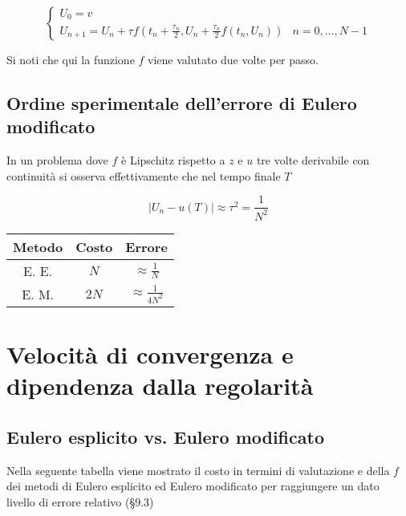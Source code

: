 \documentclass[hidelinks, 10pt]{report}
\begin{document}
\[
\begin{cases}
U_{0} = v \\
U_{n + 1} = U_{n} + \tau f \left( t_{n} + \frac{\tau_{n}}{2}, U_{n} + \frac{\tau_{n}}{2} f(t_{n}, U_{n}) \right)	 & n = 0, \dotsc, N - 1
\end{cases}
\]

Si noti che qui la funzione $ f $ viene valutato due volte per passo. 

\subsection{Ordine sperimentale dell'errore di Eulero modificato}
In un problema dove $ f $ \`e Lipschitz rispetto a  $ z $ e $ u $ tre volte derivabile con continuit\`a si osserva effettivamente che nel tempo finale $ T $

\[ \vert U_{n} - u(T) \vert \approx \tau^{2} = \frac{1}{N^{2}} \]

\begin{center}
\begin{tabular}{c|c|c}
	Metodo & Costo & Errore \\
\hline
	E. E. & $ N $ & $ \approx \frac{1}{N} $ \\
\hline
	E. M. & $ 2N $ & $ \approx \frac{1}{4N^{2}} $ \\
\end{tabular}
\end{center}

\section{Velocit\`a di convergenza e dipendenza dalla regolarit\`a}
\subsection{Eulero esplicito vs. Eulero modificato}

Nella seguente tabella viene mostrato il costo in termini di valutazione e della $ f $ dei metodi di Eulero esplicito ed Eulero modificato per raggiungere un dato livello di errore relativo (\S 9.3)
\end{document}
